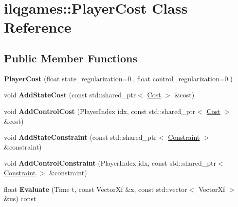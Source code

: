 \hypertarget{classilqgames_1_1_player_cost}{}\section{ilqgames\+:\+:Player\+Cost Class Reference}
\label{classilqgames_1_1_player_cost}
\subsection*{Public Member Functions}
\begin{DoxyCompactItemize}
\item 
{\bfseries Player\+Cost} (float state\+\_\+regularization=0., float control\+\_\+regularization=0.)\hypertarget{classilqgames_1_1_player_cost_a983c96844cf283233a3c041b58453349}{}\label{classilqgames_1_1_player_cost_a983c96844cf283233a3c041b58453349}

\item 
void {\bfseries Add\+State\+Cost} (const std\+::shared\+\_\+ptr$<$ \hyperlink{classilqgames_1_1_cost}{Cost} $>$ \&cost)\hypertarget{classilqgames_1_1_player_cost_a3135d5f4c7722edc1ae385e0ecafcc87}{}\label{classilqgames_1_1_player_cost_a3135d5f4c7722edc1ae385e0ecafcc87}

\item 
void {\bfseries Add\+Control\+Cost} (Player\+Index idx, const std\+::shared\+\_\+ptr$<$ \hyperlink{classilqgames_1_1_cost}{Cost} $>$ \&cost)\hypertarget{classilqgames_1_1_player_cost_aba4df0e6414aba024c86bf77fe57f819}{}\label{classilqgames_1_1_player_cost_aba4df0e6414aba024c86bf77fe57f819}

\item 
void {\bfseries Add\+State\+Constraint} (const std\+::shared\+\_\+ptr$<$ \hyperlink{classilqgames_1_1_constraint}{Constraint} $>$ \&constraint)\hypertarget{classilqgames_1_1_player_cost_a9c1a21f669ab3f937c3be8a49bf7b5b3}{}\label{classilqgames_1_1_player_cost_a9c1a21f669ab3f937c3be8a49bf7b5b3}

\item 
void {\bfseries Add\+Control\+Constraint} (Player\+Index idx, const std\+::shared\+\_\+ptr$<$ \hyperlink{classilqgames_1_1_constraint}{Constraint} $>$ \&constraint)\hypertarget{classilqgames_1_1_player_cost_a9df6549112ab9b03bd639b4955b700da}{}\label{classilqgames_1_1_player_cost_a9df6549112ab9b03bd639b4955b700da}

\item 
float {\bfseries Evaluate} (Time t, const Vector\+Xf \&x, const std\+::vector$<$ Vector\+Xf $>$ \&us) const \hypertarget{classilqgames_1_1_player_cost_ac1ad99a1822d97a53d084fd9da162cb1}{}\label{classilqgames_1_1_player_cost_ac1ad99a1822d97a53d084fd9da162cb1}


\end{DoxyCompactItemize}
